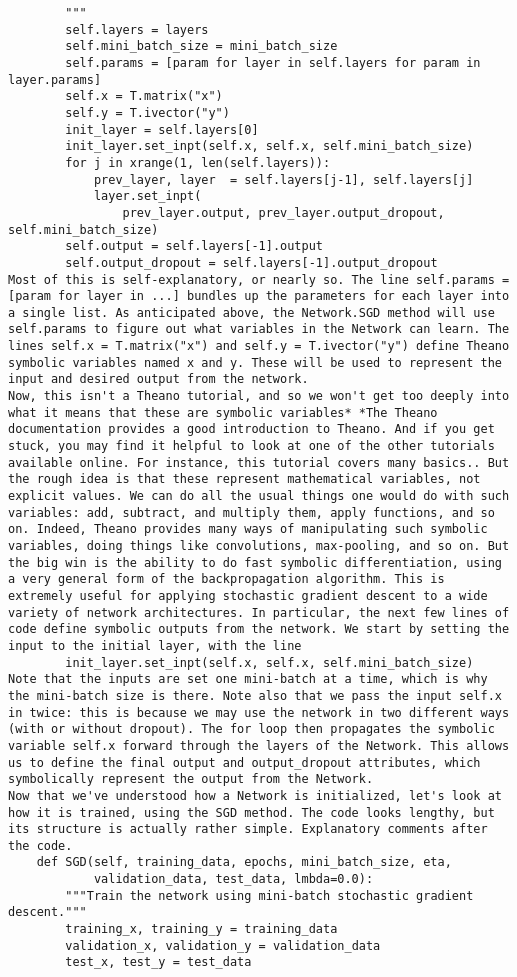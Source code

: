 \begin{lstlisting}
        """
        self.layers = layers
        self.mini_batch_size = mini_batch_size
        self.params = [param for layer in self.layers for param in layer.params]
        self.x = T.matrix("x")  
        self.y = T.ivector("y")
        init_layer = self.layers[0]
        init_layer.set_inpt(self.x, self.x, self.mini_batch_size)
        for j in xrange(1, len(self.layers)):
            prev_layer, layer  = self.layers[j-1], self.layers[j]
            layer.set_inpt(
                prev_layer.output, prev_layer.output_dropout, self.mini_batch_size)
        self.output = self.layers[-1].output
        self.output_dropout = self.layers[-1].output_dropout
Most of this is self-explanatory, or nearly so. The line self.params = [param for layer in ...] bundles up the parameters for each layer into a single list. As anticipated above, the Network.SGD method will use self.params to figure out what variables in the Network can learn. The lines self.x = T.matrix("x") and self.y = T.ivector("y") define Theano symbolic variables named x and y. These will be used to represent the input and desired output from the network.
Now, this isn't a Theano tutorial, and so we won't get too deeply into what it means that these are symbolic variables* *The Theano documentation provides a good introduction to Theano. And if you get stuck, you may find it helpful to look at one of the other tutorials available online. For instance, this tutorial covers many basics.. But the rough idea is that these represent mathematical variables, not explicit values. We can do all the usual things one would do with such variables: add, subtract, and multiply them, apply functions, and so on. Indeed, Theano provides many ways of manipulating such symbolic variables, doing things like convolutions, max-pooling, and so on. But the big win is the ability to do fast symbolic differentiation, using a very general form of the backpropagation algorithm. This is extremely useful for applying stochastic gradient descent to a wide variety of network architectures. In particular, the next few lines of code define symbolic outputs from the network. We start by setting the input to the initial layer, with the line
        init_layer.set_inpt(self.x, self.x, self.mini_batch_size)
Note that the inputs are set one mini-batch at a time, which is why the mini-batch size is there. Note also that we pass the input self.x in twice: this is because we may use the network in two different ways (with or without dropout). The for loop then propagates the symbolic variable self.x forward through the layers of the Network. This allows us to define the final output and output_dropout attributes, which symbolically represent the output from the Network.
Now that we've understood how a Network is initialized, let's look at how it is trained, using the SGD method. The code looks lengthy, but its structure is actually rather simple. Explanatory comments after the code.
    def SGD(self, training_data, epochs, mini_batch_size, eta, 
            validation_data, test_data, lmbda=0.0):
        """Train the network using mini-batch stochastic gradient descent."""
        training_x, training_y = training_data
        validation_x, validation_y = validation_data
        test_x, test_y = test_data


\end{lstlisting}

